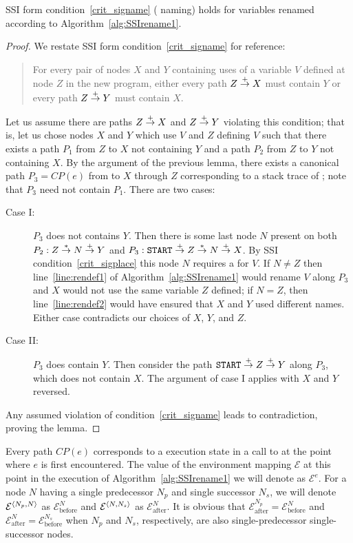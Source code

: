\documentclass[12pt,titlepage,twoside]{article}
\begin{document}
\begin{lemma}\label{lem:renamesig}
SSI form condition~\ref{crit_signame} (\sigfunction{} naming) holds for
variables renamed according to Algorithm~\ref{alg:SSIrename1}.
\end{lemma}
\begin{proof}
We restate SSI form condition~\ref{crit_signame} for reference:
\begin{quote}
For every pair of nodes $X$ and $Y$ containing uses of a
variable $V$ defined at node $Z$ in the new program, either every path
$Z \stackrel{+}{\rightarrow} X$ must contain $Y$ or every path $Z \stackrel{+}{\rightarrow} Y$ must
contain $X$.
\end{quote}
Let us assume there are paths $Z\stackrel{+}{\rightarrow} X$ and $Z\stackrel{+}{\rightarrow} Y$
violating this condition; that is, let us chose nodes $X$ and $Y$
which use $V$ and $Z$ defining $V$ such that there exists a path $P_1$
from $Z$ to $X$ not containing $Y$ and a path $P_2$ from $Z$ to $Y$ not
containing $X$.  By the argument of the previous lemma, there exists
a canonical path $P_3=CP(e)$ from  to $X$ through $Z$
corresponding to a stack
trace of ; note that $P_3$ need not contain $P_1$.
There are two cases:
\begin{description}
\item[Case I:] $P_3$ does not contains $Y$.  Then there is some last
node $N$ present on both $P_2: Z\stackrel{*}{\rightarrow} N\stackrel{+}{\rightarrow} Y$ and
$P_3: \texttt{START}\stackrel{+}{\rightarrow} Z\stackrel{*}{\rightarrow} N\stackrel{+}{\rightarrow} X$.  By SSI
condition~\ref{crit_sigplace} this node $N$ requires a \sigfunction{}
for $V$.  If $N\not=Z$ then line~\ref{line:rendef1} of
Algorithm~\ref{alg:SSIrename1} would rename $V$ along $P_3$
and $X$ would not use the same variable $Z$ defined; if
$N=Z$, then line~\ref{line:rendef2} would have ensured that $X$
and $Y$ used different names.  Either case contradicts our choices of
$X$, $Y$, and $Z$.
\item[Case II:] $P_3$ does contain $Y$.  Then consider the path
$\texttt{START}\stackrel{+}{\rightarrow} Z\stackrel{+}{\rightarrow} Y$ along $P_3$, which does not
contain $X$.  The argument of case I applies with $X$ and $Y$ reversed.
\end{description}
Any assumed violation of condition~\ref{crit_signame} leads to
contradiction, proving the lemma.
\end{proof}

Every path $CP(e)$ corresponds to a execution state in a call to
 at the point where $e$ is first encountered.  The value
of the environment mapping $\mathcal{E}$ at this point in the
execution of Algorithm~\ref{alg:SSIrename1} we will denote as
$\mathcal{E}^e$.  For a node $N$ having a single predecessor $N_p$ and
single successor $N_s$, we will denote
$\mathcal{E}^{\left\langle N_p,N \right\rangle}$ as $\mathcal{E}_{\text{before}}^N$ and 
$\mathcal{E}^{\left\langle N,N_s \right\rangle}$ as $\mathcal{E}_{\text{after}}^N$.
It is obvious that 
$\mathcal{E}_{\text{after}}^{N_p} = \mathcal{E}_{\text{before}}^{N  }$ and
$\mathcal{E}_{\text{after}}^{N  } = \mathcal{E}_{\text{before}}^{N_s}$
when $N_p$ and $N_s$, respectively, are also single-predecessor
single-successor nodes.
\end{document}
